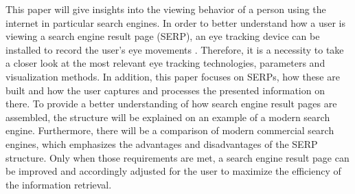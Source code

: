 This paper will give insights into the viewing behavior of a person using the internet in particular search engines. In order to better understand how a user is viewing a search engine result page (SERP), an eye tracking device can be installed to record the user's eye movements \autocite{liu2015influence}. 
Therefore, it is a necessity to take a closer look at the most relevant eye tracking technologies, parameters and visualization methods. In addition, this paper focuses on SERPs, how these are built and how the user captures and processes the presented information on there.
To provide a better understanding of how search engine result pages are assembled, the structure will be explained on an example of a modern search engine. Furthermore, there will be a comparison of modern commercial search engines, which emphasizes the advantages and disadvantages of the SERP structure.
Only when those requirements are met, a search engine result page can be improved and accordingly adjusted for the user to maximize the efficiency of the information retrieval.
